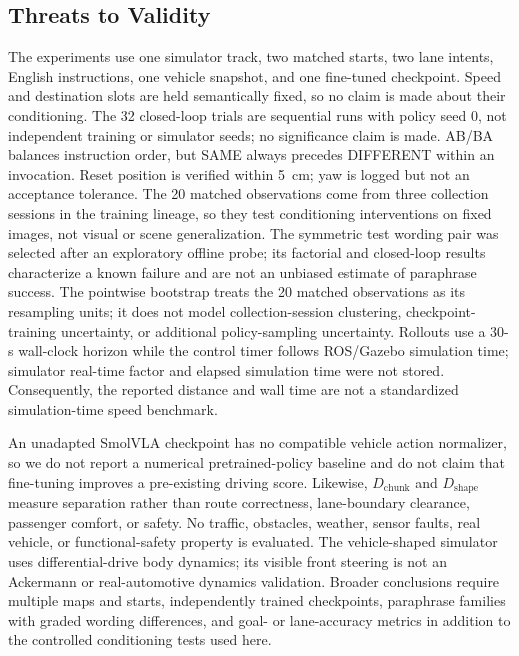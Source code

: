 \documentclass[letterpaper,conference]{IEEEtran}
\newcommand{\dchunk}{D_{\mathrm{chunk}}}
\newcommand{\dshape}{D_{\mathrm{shape}}}
\begin{document}
\subsection{Threats to Validity}
The experiments use one simulator track, two matched starts, two lane intents,
English instructions, one vehicle snapshot, and one fine-tuned checkpoint. Speed and
destination slots are held semantically fixed, so no claim is made about their
conditioning. The
32 closed-loop trials are sequential runs with policy seed 0, not independent
training or simulator seeds; no significance claim is made. AB/BA balances
instruction order, but SAME always precedes DIFFERENT within an invocation.
Reset position is verified within 5~cm; yaw is logged but not an acceptance
tolerance. The 20 matched observations come from three collection sessions in
the training lineage, so they test conditioning interventions on fixed images,
not visual or scene generalization. The symmetric test wording pair was
selected after an exploratory offline probe; its factorial and closed-loop
results characterize a known failure and are not an unbiased estimate of
paraphrase success. The pointwise bootstrap treats the 20 matched observations
as its resampling units; it does not model collection-session clustering,
checkpoint-training uncertainty, or additional policy-sampling uncertainty.
Rollouts use a 30-s wall-clock horizon while the control timer follows ROS/Gazebo
simulation time; simulator real-time factor and elapsed simulation time were not
stored. Consequently, the reported distance and wall time are not a standardized
simulation-time speed benchmark.

An unadapted SmolVLA checkpoint has no compatible vehicle action normalizer, so
we do not report a numerical pretrained-policy baseline and do not claim that
fine-tuning improves a pre-existing driving score. Likewise, $\dchunk$ and
$\dshape$ measure separation rather than route correctness, lane-boundary
clearance, passenger comfort, or safety. No traffic, obstacles, weather,
sensor faults, real vehicle, or functional-safety property is evaluated.
The vehicle-shaped simulator uses differential-drive body dynamics; its visible
front steering is not an Ackermann or real-automotive dynamics validation.
Broader conclusions require multiple maps and starts, independently trained
checkpoints, paraphrase families with graded wording differences, and goal- or
lane-accuracy metrics in addition to the controlled conditioning tests used
here.

\balance
\end{document}
